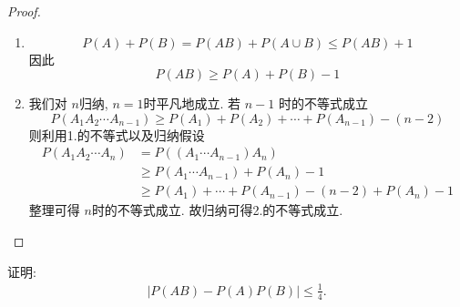 \documentclass[../main.tex]{subfiles}
\begin{document}
\begin{proof}
    \begin{enumerate}
        \item \[
        P\left( A \right)+ P\left( B \right)= P\left( AB \right)+ P\left( A\cup B \right)\le P\left( AB \right)+ 1     
        \]因此 \[
        P\left( AB \right)\ge P\left( A \right)+ P\left( B \right)-1   
        \]
        \item 我们对 \(  n  \)归纳, \(  n = 1  \)时平凡地成立. 若 \(  n-1  \)   时的不等式成立 \[
        P\left( A_1A_2\cdots A_{n-1} \right)\ge  P\left( A_1 \right)+ P\left( A_2 \right)+ \cdots + P\left( A_{n-1} \right)-\left( n-2 \right)     
        \]则利用1.的不等式以及归纳假设 \[
        \begin{aligned}
        P\left( A_1A_2\cdots A_{n} \right)&= P\left( \left( A_1\cdots A_{n-1} \right)A_{n}  \right)   \\ 
         &\ge P\left( A_1\cdots A_{n-1} \right)+ P\left( A_{n} \right)-1  \\ 
          &\ge P\left( A_1 \right)+ \cdots + P\left( A_{n-1} \right)-\left( n-2 \right) + P\left( A_{n} \right)   -1
        \end{aligned}
        \]整理可得 \(  n  \)时的不等式成立. 故归纳可得2.的不等式成立. 
    \end{enumerate}
    
\end{proof}
\begin{exercise}{}{}
证明:
\[\begin{aligned}
|P(AB) - P(A)P(B)| \le \frac{1}{4}.
\end{aligned}\]
\end{exercise}
\end{document}
